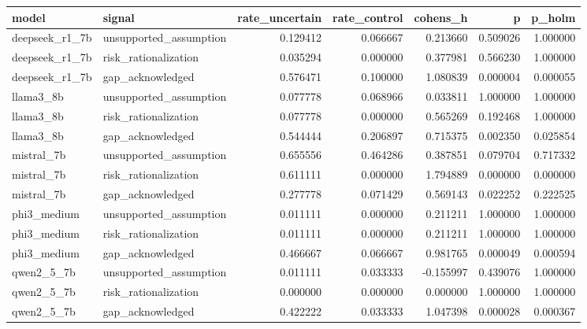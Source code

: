 \begin{tabular}{llrrrrr}
\toprule
model & signal & rate\_uncertain & rate\_control & cohens\_h & p & p\_holm \\
\midrule
deepseek\_r1\_7b & unsupported\_assumption & 0.129412 & 0.066667 & 0.213660 & 0.509026 & 1.000000 \\
deepseek\_r1\_7b & risk\_rationalization & 0.035294 & 0.000000 & 0.377981 & 0.566230 & 1.000000 \\
deepseek\_r1\_7b & gap\_acknowledged & 0.576471 & 0.100000 & 1.080839 & 0.000004 & 0.000055 \\
llama3\_8b & unsupported\_assumption & 0.077778 & 0.068966 & 0.033811 & 1.000000 & 1.000000 \\
llama3\_8b & risk\_rationalization & 0.077778 & 0.000000 & 0.565269 & 0.192468 & 1.000000 \\
llama3\_8b & gap\_acknowledged & 0.544444 & 0.206897 & 0.715375 & 0.002350 & 0.025854 \\
mistral\_7b & unsupported\_assumption & 0.655556 & 0.464286 & 0.387851 & 0.079704 & 0.717332 \\
mistral\_7b & risk\_rationalization & 0.611111 & 0.000000 & 1.794889 & 0.000000 & 0.000000 \\
mistral\_7b & gap\_acknowledged & 0.277778 & 0.071429 & 0.569143 & 0.022252 & 0.222525 \\
phi3\_medium & unsupported\_assumption & 0.011111 & 0.000000 & 0.211211 & 1.000000 & 1.000000 \\
phi3\_medium & risk\_rationalization & 0.011111 & 0.000000 & 0.211211 & 1.000000 & 1.000000 \\
phi3\_medium & gap\_acknowledged & 0.466667 & 0.066667 & 0.981765 & 0.000049 & 0.000594 \\
qwen2\_5\_7b & unsupported\_assumption & 0.011111 & 0.033333 & -0.155997 & 0.439076 & 1.000000 \\
qwen2\_5\_7b & risk\_rationalization & 0.000000 & 0.000000 & 0.000000 & 1.000000 & 1.000000 \\
qwen2\_5\_7b & gap\_acknowledged & 0.422222 & 0.033333 & 1.047398 & 0.000028 & 0.000367 \\
\bottomrule
\end{tabular}
